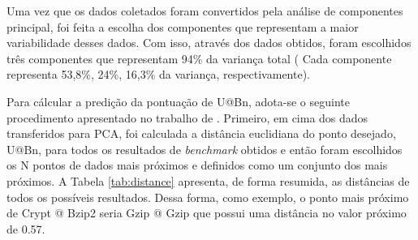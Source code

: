 Uma vez que os dados coletados foram convertidos pela análise de componentes principal, foi feita a escolha dos componentes que representam a maior variabilidade desses dados. Com isso, através dos dados obtidos, foram escolhidos três componentes que representam 94\% da variança total ( Cada componente representa 53,8\%, 24\%, 16,3\% da variança, respectivamente).

Para cálcular a predição da pontuação de U@Bn, adota-se o seguinte procedimento apresentado no trabalho de . Primeiro, em cima dos dados transferidos para PCA, foi calculada a distância euclidiana do ponto desejado, U@Bn, para todos os resultados de \textit{benchmark} obtidos e então foram escolhidos os N pontos de dados mais próximos e definidos como um conjunto dos mais próximos. A Tabela \ref{tab:distance} apresenta, de forma resumida, as distâncias de todos os possíveis resultados. Dessa forma, como exemplo, o ponto mais próximo de Crypt @ Bzip2 seria Gzip @ Gzip que possui uma distância no valor próximo de 0.57.

